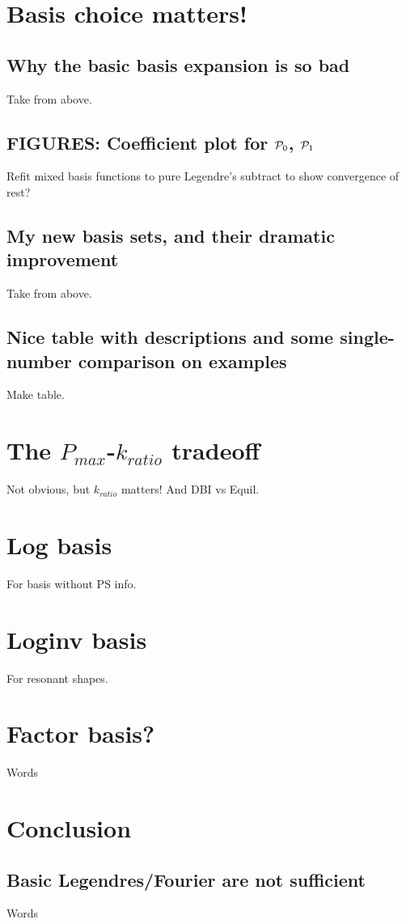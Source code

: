 \section{Basis choice matters!}
    \subsection{Why the basic basis expansion is so bad}
    Take from above.
    \subsection{FIGURES: Coefficient plot for $\mathcal{P}_0$, $\mathcal{P}_1$}
    Refit mixed basis functions to pure Legendre's subtract to show convergence of rest?
    \newpage
    \subsection{My new basis sets, and their dramatic improvement}
    Take from above.
    \subsection{Nice table with descriptions and some single-number comparison on examples}
    Make table.
\section{The $P_{max}$-$k_{ratio}$ tradeoff}
    Not obvious, but $k_{ratio}$ matters!
    And DBI vs Equil.
    \newpage
\section{Log basis}
    For basis without PS info.
    \newpage
\section{Loginv basis}
    For resonant shapes.
    \newpage
\section{Factor basis?}
    Words
\newpage
\section{Conclusion}
    \subsection{Basic Legendres/Fourier are not sufficient}
    Words
